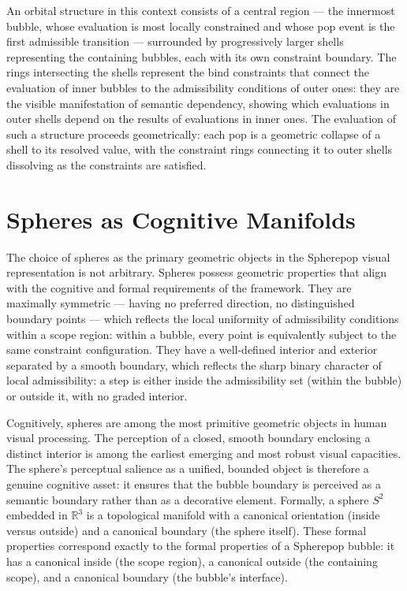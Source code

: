 \documentclass[12pt,openany]{book}
\theoremstyle{plain}
\theoremstyle{definition}
\theoremstyle{remark}
\begin{document}
An orbital structure in this context consists of a central region — the innermost bubble, whose evaluation is most locally constrained and whose pop event is the first admissible transition — surrounded by progressively larger shells representing the containing bubbles, each with its own constraint boundary. The rings intersecting the shells represent the bind constraints that connect the evaluation of inner bubbles to the admissibility conditions of outer ones: they are the visible manifestation of semantic dependency, showing which evaluations in outer shells depend on the results of evaluations in inner ones. The evaluation of such a structure proceeds geometrically: each pop is a geometric collapse of a shell to its resolved value, with the constraint rings connecting it to outer shells dissolving as the constraints are satisfied.

\section{Spheres as Cognitive Manifolds}

The choice of spheres as the primary geometric objects in the Spherepop visual representation is not arbitrary. Spheres possess geometric properties that align with the cognitive and formal requirements of the framework. They are maximally symmetric — having no preferred direction, no distinguished boundary points — which reflects the local uniformity of admissibility conditions within a scope region: within a bubble, every point is equivalently subject to the same constraint configuration. They have a well-defined interior and exterior separated by a smooth boundary, which reflects the sharp binary character of local admissibility: a step is either inside the admissibility set (within the bubble) or outside it, with no graded interior.

Cognitively, spheres are among the most primitive geometric objects in human visual processing. The perception of a closed, smooth boundary enclosing a distinct interior is among the earliest emerging and most robust visual capacities. The sphere's perceptual salience as a unified, bounded object is therefore a genuine cognitive asset: it ensures that the bubble boundary is perceived as a semantic boundary rather than as a decorative element. Formally, a sphere $S^2$ embedded in $\mathbb{R}^3$ is a topological manifold with a canonical orientation (inside versus outside) and a canonical boundary (the sphere itself). These formal properties correspond exactly to the formal properties of a Spherepop bubble: it has a canonical inside (the scope region), a canonical outside (the containing scope), and a canonical boundary (the bubble's interface).
\end{document}
